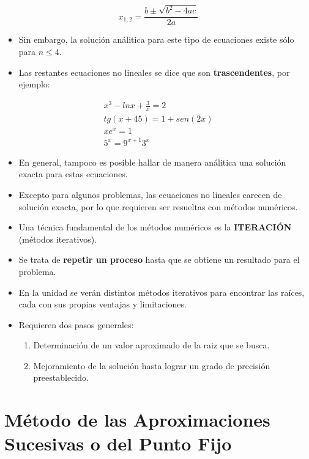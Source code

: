 \documentclass[openany]{book}
\providecommand{\tightlist}{%
  \setlength{\itemsep}{0pt}\setlength{\parskip}{0pt}}
\begin{document}
\[
x_{1,2} = \frac{b \pm \sqrt{b^2 - 4ac}}{2a}
\]

\begin{itemize}
\item
  Sin embargo, la solución análitica para este tipo de ecuaciones existe sólo para \(n \le 4\).
\item
  Las restantes ecuaciones no lineales se dice que son \textbf{trascendentes}, por ejemplo:
\end{itemize}

\begin{gather*}
x^3 - ln x + \frac{3}{x} = 2 \\
tg(x + 45) = 1 + sen(2x) \\
xe^{x}=1 \\
{\displaystyle 5^{x}=9^{x+1} 3^{x}}
\end{gather*}

\begin{itemize}
\item
  En general, tampoco es posible hallar de manera análitica una solución exacta para estas ecuaciones.
\item
  Excepto para algunos problemas, las ecuaciones no lineales carecen de solución exacta, por lo que requieren ser resueltas con métodos numéricos.
\item
  Una técnica fundamental de los métodos numéricos es la \textbf{ITERACIÓN} (métodos iterativos).
\item
  Se trata de \textbf{repetir un proceso} hasta que se obtiene un resultado para el problema.
\item
  En la unidad se verán distintos métodos iterativos para encontrar las raíces, cada con sus propias ventajas y limitaciones.
\item
  Requieren dos pasos generales:

  \begin{enumerate}
  \def\labelenumi{\arabic{enumi}.}
  \tightlist
  \item
    Determinación de un valor aproximado de la raiz que se busca.
  \item
    Mejoramiento de la solución hasta lograr un grado de precisión preestablecido.
  \end{enumerate}
\end{itemize}

\hypertarget{muxe9todo-de-las-aproximaciones-sucesivas-o-del-punto-fijo}{%
\section{Método de las Aproximaciones Sucesivas o del Punto Fijo}\label{muxe9todo-de-las-aproximaciones-sucesivas-o-del-punto-fijo}}
\end{document}
